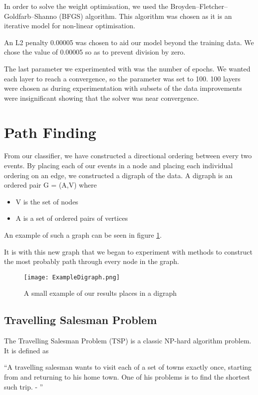 \documentclass[bsc,frontabs,twoside,singlespacing,parskip,deptreport]{infthesis}     %
\begin{document}
 In order to solve the weight optimisation, we used the Broyden–Fletcher–Goldfarb–Shanno (BFGS) algorithm.
 This algorithm was chosen as it is an iterative model for non-linear optimisation.

 An L2 penalty 0.00005 was chosen to aid our model beyond the training data.
 We chose the value of 0.00005 so as to prevent division by zero. 

 The last parameter we experimented with was the number of epochs.
 We wanted each layer to reach a convergence, so the parameter was set to 100.
 100 layers were chosen as during experimentation with subsets of the data improvements were
 insignificant showing that the solver was near convergence.

 \section{Path Finding} \label{chapter:graphing}
From our classifier, we have constructed a directional ordering between every two events.
By placing each of our events in a node and placing each individual ordering on an edge, we constructed
a digraph of the data.
A digraph is an ordered pair G = (A,V) where\cite{bang2008digraphs}
\begin{itemize}
  \item V is the set of nodes
  \item A is a set of ordered pairs of vertices
\end{itemize}
An example of such a graph can be seen in figure \ref{fig:digraph}.

It is with this new graph that we began to experiment with methods to construct the most probably path through every
node in the graph.


\begin{figure}
  \centering
  \texttt{[image: ExampleDigraph.png]}
  \caption{A small example of our results places in a digraph}
  \label{fig:digraph}
 \end{figure}

\subsection{Travelling Salesman Problem}
The Travelling Salesman Problem (TSP) is a classic NP-hard algorithm problem\cite{junger1995traveling}.%
It is defined as
\begin{center}
\enquote{A travelling salesman wants to visit each of a set of towns exactly once, starting
from and returning to his home town. One of his problems is to find the shortest
such trip. - \cite{junger1995traveling}}
\end{center}
\end{document}
